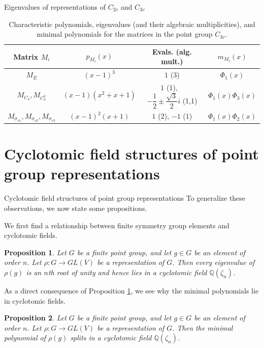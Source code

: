 \documentclass{beamer}
\newcommand{\vs}{\vspace{5mm}}
\newtheorem{proposition}{Proposition}
\begin{document}
    \begin{frame}{Eigenvalues of representations of $C_{2v}$ and $C_{3v}$}
        \begin{table}[htbp]
            \centering\small
            \renewcommand{\arraystretch}{3}
            \begin{tabular}{cccc}
                Matrix $M_i$ & $p_{M_i}(x)$ & Evals. (alg. mult.) & $m_{M_i}(x)$\\
                \hline
                $M_E$ & $(x-1)^3$ & $1$ (3) & $\Phi_1(x)$\\[5mm]
                $M_{C_3}, M_{C_3^2}$ & $(x-1)(x^2+x+1)$ & \parbox{3cm}{\centering $1$ (1),\\~\\ $-\dfrac12\pm\dfrac{\sqrt{3}}{2}i$ (1,1)} & $\Phi_1(x)\Phi_3(x)$\\[5mm]
                $M_{\sigma_{v1}}, M_{\sigma_{v2}}, M_{\sigma_{v3}}$ & $(x-1)^2(x+1)$ & $1$ (2), $-1$ (1) & $\Phi_1(x)\Phi_2(x)$
            \end{tabular}
            \caption{Characteristic polynomials, eigenvalues (and their algebraic multiplicities), and minimal polynomials for the matrices in the point group $C_{3v}$.}
            \label{tab:c3vpoly}
        \end{table}
    \end{frame}

    \section{Cyclotomic field structures of point group representations}
    
    \begin{frame}{Cyclotomic field structures of point group representations}
        To generalize these observations, we now state some propositions.
        \vs

        We first find a relationship between finite symmetry group elements and cyclotomic fields.

        \begin{proposition}
            Let $G$ be a finite point group, and let $g\in G$ be an element of order $n$. Let $\rho:G\to GL(V)$ be a representation of $G$. Then every eigenvalue of $\rho(g)$ is an $n$th root of unity and hence lies in a cyclotomic field $\mathbb{Q}(\zeta_n)$.
            \label{prop:eigcyc}
        \end{proposition}

        {
            As a direct consequence of Proposition \ref{prop:eigcyc}, we see why the minimal polynomials lie in cyclotomic fields.

            \begin{proposition}
                Let $G$ be a finite point group, and let $g\in G$ be an element of order $n$. Let $\rho:G\to GL(V)$ be a representation of $G$. Then the minimal polynomial of $\rho(g)$ splits in a cyclotomic field $\mathbb{Q}(\zeta_n)$.
            \label{prop:minpolycyc}
            \end{proposition}
        }
    \end{frame}
\end{document}
